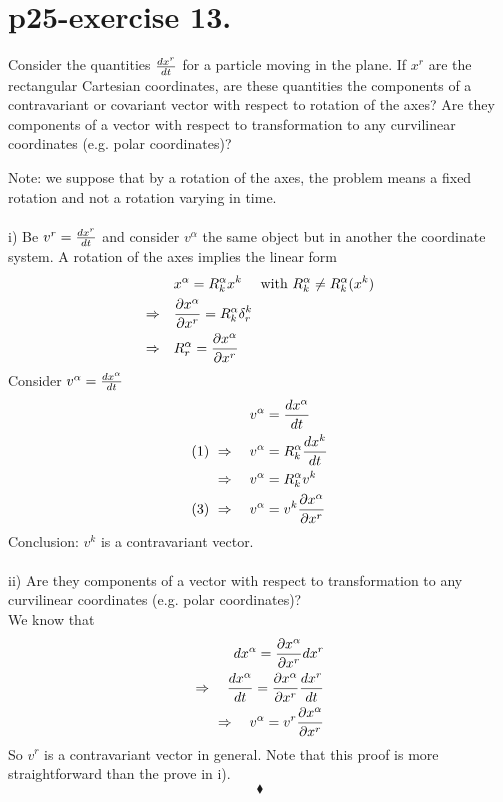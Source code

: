 \section{p25-exercise 13.}
\begin{tcolorbox}
Consider the quantities $\dv{x^r}{t}$ for a particle moving in the plane. If $x^r$ are the rectangular Cartesian coordinates, are these quantities the components of a contravariant or covariant vector with respect to rotation of the axes? Are they components of a vector with respect to transformation to any curvilinear coordinates (e.g. polar coordinates)?
\end{tcolorbox}
Note: we suppose that by a rotation of the axes, the problem means a fixed rotation and not a rotation varying in time.\\\\
 i) Be $v^{r} = \dv{x^r}{t}$ and consider $v^{\alpha}$  the same object but in another the coordinate system.
 A rotation of the axes implies the linear form
 \begin{align}
 \ &x^{\alpha} = R^{\alpha }_k x^k \quad \text{ with } R^{\alpha }_k \neq R^{\alpha }_k (x^k)\\
 \Rightarrow\quad  & \pdv{x^{\alpha}}{x^r} = R^{\alpha }_k \delta^k_r \\
 \Rightarrow\quad  & R^{\alpha }_r  = \pdv{x^{\alpha}}{x^r} 
 \end{align}
 Consider $v^{\alpha} = \dv{x^{\alpha}}{t}$
 \begin{align}
 v^{\alpha} &= \dv{x^{\alpha}}{t}\\
 \text{(1)   }\Rightarrow\quad v^{\alpha} &= R^{\alpha }_k \dv{x^k}{t}\\
 \Rightarrow\quad v^{\alpha} &= R^{\alpha }_k v^k\\
 \text{(3)   }\Rightarrow\quad v^{\alpha} &= v^k\pdv{x^{\alpha}}{x^r} 
 \end{align}
 Conclusion: $v^k$ is a contravariant vector.\\\\
 ii) Are they components of a vector with respect to transformation to any curvilinear coordinates (e.g. polar coordinates)?\\
We know that 
\begin{align}
\ dx^{\alpha} = \pdv{x^{\alpha}}{x^r}dx^r\\
\Rightarrow \quad \dv{x^{\alpha}}{t} = \pdv{x^{\alpha}}{x^r}\dv{x^r}{t}\\
\Rightarrow \quad v^{\alpha} = v^r\pdv{x^{\alpha}}{x^r}
\end{align}
So $v^r$ is a contravariant vector in general. Note that this proof is more straightforward than the prove in i).
$$\blacklozenge$$
\pagebreak[4]

